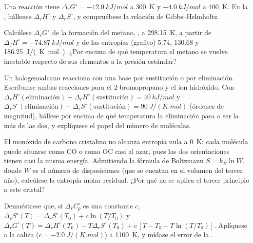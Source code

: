 \begin{exercise}[$\star\star$]\label{exo:b2:reaction-free-energy:7}
Una reacción tiene $\Delta_r G^\circ = \qty{-12.0}{kJ/mol}$ a \qty{300}{K}
y $\qty{-4.0}{kJ/mol}$ a \qty{400}{K}. En la ,
hállense $\Delta_r H^\circ$ y $\Delta_r S^\circ$, y compruébese la
relación de Gibbs--Helmholtz.
\end{exercise}

\begin{exercise}[$\star\star$]\label{exo:b2:reaction-free-energy:8}
Calcúlese $\Delta_r G^\circ$ de la formación del metano, , a \qty{298.15}{K}, a partir de $\Delta_f H^\circ = \qty{-74.87}{kJ/mol}$
y de las entropías  (grafito) 5.74,  130.68 y 
\qty{186.25}{J/(K.mol)}. ¿Por encima de qué temperatura el metano se vuelve
inestable respecto de sus elementos a la presión estándar?
\end{exercise}

\begin{exercise}[$\star\star$]\label{exo:b2:reaction-free-energy:9}
Un halogenoalcano reacciona con una base por sustitución o por eliminación. Escríbanse
ambas reacciones para el 2-bromopropano y el ion hidróxido. Con $\Delta_r
H^\circ(\text{eliminación}) - \Delta_r H^\circ(\text{sustitución}) =
\qty{+40}{kJ/mol}$ y $\Delta_r S^\circ(\text{eliminación}) - \Delta_r
S^\circ(\text{sustitución}) = \qty{+90}{J/(K.mol)}$ (órdenes de magnitud),
hállese por encima de qué temperatura la eliminación pasa a ser la más  de
las dos, y explíquese el papel del número de moléculas.
\end{exercise}

\begin{exercise}[$\star\star\star$]\label{exo:b2:reaction-free-energy:10}
El monóxido de carbono cristalino no alcanza entropía nula a \qty{0}{K}: cada
molécula puede situarse como CO o como OC casi al azar, pues las dos orientaciones tienen
casi la misma energía. Admitiendo la fórmula de Boltzmann $S = k_B\ln W$, donde
$W$ es el número de disposiciones (que se cuentan en el volumen del tercer año), calcúlese
la entropía molar residual. ¿Por qué no se aplica el tercer principio a este
cristal?
\end{exercise}

\begin{exercise}[$\star\star\star$]\label{exo:b2:reaction-free-energy:11}
Demuéstrese que, si $\Delta_r C^\circ_p$ es una constante $c$,
$\Delta_r S^\circ(T) = \Delta_r S^\circ(T_0) + c\ln(T/T_0)$ y
$\Delta_r G^\circ(T) = \Delta_r H^\circ(T_0) - T\Delta_r S^\circ(T_0) +
c\,[T - T_0 - T\ln(T/T_0)]$. Aplíquese a la caliza ($c =
\qty{-2.0}{J/(K.mol)}$) a \qty{1100}{K}, y mídase el error de la
.
\end{exercise}

